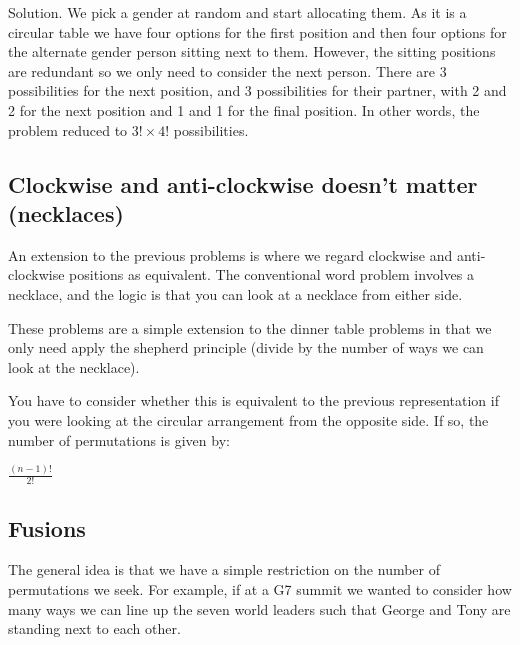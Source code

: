 \documentclass[12pt]{extbook}
\begin{document}
Solution.   We pick a gender at random and start allocating them.   As it is a circular table we have four options for the first position and then four options for the alternate gender person sitting next to them.   However, the sitting positions are redundant so we only need to consider the next person.   There are 3 possibilities for the next position, and 3 possibilities for their partner, with 2 and 2 for the next position and 1 and 1 for the final position.   In other words, the problem reduced to $3! \times 4!$ possibilities.


\subsection{Clockwise and anti-clockwise doesn't matter (necklaces)}

An extension to the previous problems is where we regard clockwise and anti-clockwise positions as equivalent.   The conventional word problem involves a necklace, and the logic is that you can look at a necklace from either side.   

These problems are a simple extension to the dinner table problems in that we only need apply the shepherd principle (divide by the number of ways we can look at the necklace).


You have to consider whether this is equivalent to the previous representation if you were looking at the circular arrangement from the opposite side.   If so, the number of permutations is given by:

$\frac{(n-1)!}{2!}$


\subsection{Fusions}


The general idea is that we have a simple restriction on the number of permutations we seek.   For example, if at a G7 summit we wanted to consider how many ways we can line up the seven world leaders such that George and Tony are standing next to each other.
\end{document}
